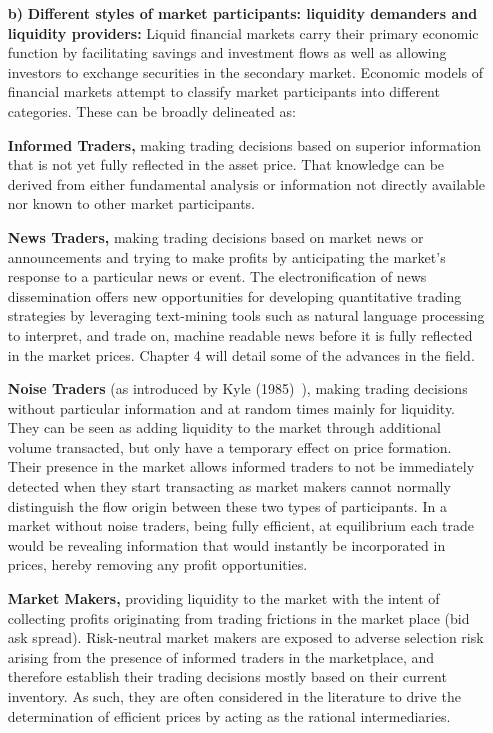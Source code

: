 \begin{enumerate}
\item[\textbf{b)}] \textbf{Different styles of market participants: liquidity demanders and liquidity providers:}
Liquid financial markets carry their primary economic function by facilitating savings and investment flows as well as allowing investors to exchange securities in the secondary market. Economic models of financial markets attempt to classify market participants into different categories. These can be broadly delineated as: 

\textbf{Informed Traders,} making trading decisions based on superior information that is not yet fully reflected in the asset price. That knowledge can be derived from either fundamental analysis or information not directly available nor known to other market participants.

\textbf{News Traders,} making trading decisions based on market news or announcements and trying to make profits by anticipating the market's response to a particular news or event. The electronification of news dissemination offers new opportunities for developing quantitative trading strategies by leveraging text-mining tools such as natural language processing to interpret, and trade on, machine readable news before it is fully reflected in the market prices. Chapter 4 will detail some of the advances in the field.

\textbf{Noise Traders} (as introduced by Kyle (1985)~\cite{kyle1985}), making trading decisions without particular information and at random times mainly for liquidity. They can be seen as adding liquidity to the market through additional volume transacted, but only have a temporary effect on price formation. Their presence in the market allows informed traders to not be immediately detected when they start transacting as market makers cannot normally distinguish the flow origin between these two types of participants. In a market without noise traders, being fully efficient, at equilibrium each trade would be revealing information that would instantly be incorporated in prices, hereby removing any profit opportunities.

\textbf{Market Makers,} providing liquidity to the market with the intent of collecting profits originating from trading frictions in the market place (bid ask spread). Risk-neutral market makers are exposed to adverse selection risk arising from the presence of informed traders in the marketplace, and therefore establish their trading decisions mostly based on their current inventory. As such, they are often considered in the literature to drive the determination of efficient prices by acting as the rational intermediaries.  


\end{enumerate}
